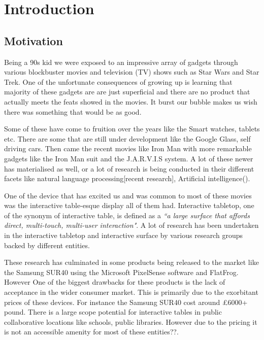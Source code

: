 
\chapter{Introduction}

\section{Motivation}
Being a 90s kid we were exposed to an impressive array of gadgets through various blockbuster movies and television (TV) shows such as Star Wars and Star Trek. One of the unfortunate consequences of growing up is learning that majority of these gadgets are are just superficial and there are no product that actually meets the feats showed in the movies. It burst our bubble makes us wish there was something that would be as good. 

Some of these have come to fruition over the years like the Smart watches, tablets etc. There are some that are still under development like the Google Glass, self driving cars. Then came the recent movies like Iron Man with more remarkable gadgets like the Iron Man suit and the J.A.R.V.I.S system. A lot of these newer has materialised as well, or a lot of research is being conducted in their different facets like natural language processing[recent research], Artificial intelligence().

One of the device that has excited us and was common to most of these movies was the interactive table-esque display all of them had. Interactive tabletop, one of the synonym of interactive table, is defined as a \emph{“a large surface that affords direct, multi-touch, multi-user interaction"}\cite{interactive-table-def}. A lot of research has been undertaken in the interactive tabletop and interactive surface by various research groups backed by different entities. 

These research has culminated in some products being released to the market like the Samsung SUR40 using the Microsoft PixelSense software\cite{samsung-sur40} and FlatFrog\cite{flatfrog}. However One of the biggest drawbacks for these products is the lack of acceptance in the wider consumer market. This is primarily due to the exorbitant prices of these devices. For instance the Samsung SUR40 cost around £6000+ pound\cite{samsung-sur40-price}. There is a large scope potential for interactive tables in public collaborative locations like schools, public libraries. However due to the pricing it is not an accessible amenity for most of these entities??.

